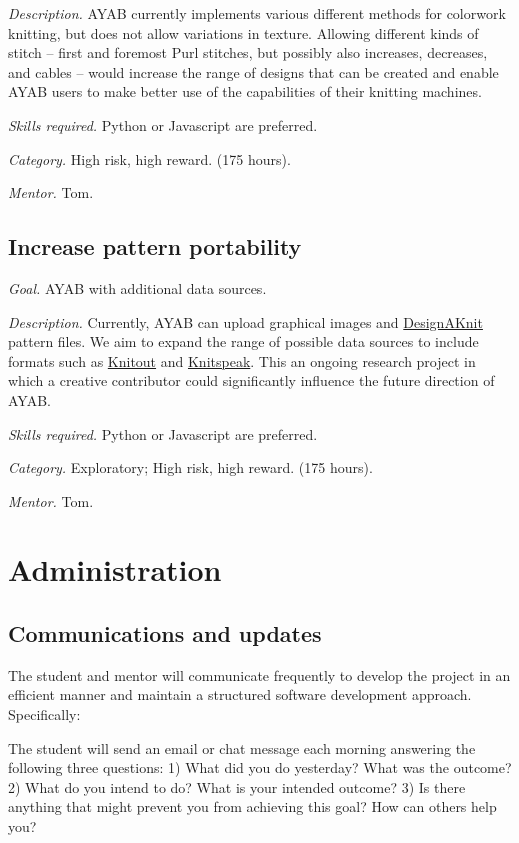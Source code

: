 \documentclass{article}
\begin{document}
\textit{Description.} AYAB currently implements various different methods for colorwork knitting, but does not allow variations in texture. Allowing different kinds of stitch -- first and foremost Purl stitches, but possibly also increases, decreases, and cables -- would increase the range of designs that can be created and enable AYAB users to make better use of the capabilities of their knitting machines.

\textit{Skills required.} Python or Javascript are preferred.

\textit{Category.} High risk, high reward. (175 hours). 

\textit{Mentor.} Tom.


\subsection{Increase pattern portability} 

\textit{Goal.} AYAB with additional data sources.

\textit{Description.} Currently, AYAB can upload graphical images and \href{https://www.softbyte.co.uk/designaknit9.htm}{DesignAKnit} pattern files. We aim to expand the range of possible data sources to include formats such as \href{https://textiles-lab.github.io/knitout/knitout.html}{Knitout} and \href{https://stitch-maps.com/about/knitspeak/}{Knitspeak}. This an ongoing research project in which a creative contributor could significantly influence the future direction of AYAB.

\textit{Skills required.} Python or Javascript are preferred.

\textit{Category.} Exploratory; High risk, high reward. (175 hours). 

\textit{Mentor.} Tom.


\section{Administration}

\subsection{Communications and updates}

The student and mentor will communicate frequently to develop the project in an efficient manner and
maintain a structured software development approach. Specifically:

The student will send an email or chat message each morning answering the following three questions:
1) What did you do yesterday? What was the outcome?
2) What do you intend to do? What is your intended outcome?
3) Is there anything that might prevent you from achieving this goal? How can others help
you?
\end{document}
